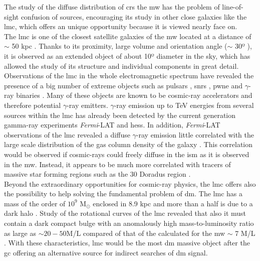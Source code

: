 \documentclass[main.tex]{subfiles}
\begin{document}
The study of the diffuse distribution of \glspl{cr} the \gls{mw} has the problem of line-of-sight confusion of sources, encouraging its study in other close galaxies like the \gls{lmc}, which offers an unique opportunity because it is viewed nearly face on.\\

The \gls{lmc} is one of the closest satellite galaxies of the \gls{mw} located at a distance of $\sim$ 50 kpc \cite{2013LMCdistance1}. Thanks to its proximity, large volume and orientation angle ($\sim$ 30º \cite{2004StructureandOrientationLMC}), it is observed as an extended object of about 10º diameter in the sky, which has allowed the study of its structure and individual components in great detail. Observations of the \gls{lmc} in the whole electromagnetic spectrum have revealed the presence of a big number of extreme objects such as pulsars \cite{2013RadioPulsarsLMC} \cite{2016LMCFermiLAT}, \glspl{snr} \cite{2015MultiwavelengthLMCsnr} \cite{2012XMM1987} \cite{2016SNRinXrayLMC},  \gls{pwne} \cite{2015HESSTeVLMC} \cite{2016LMCFermiLAT} \cite{2003PWNeintheLMC} \cite{2008PWNeXrayLMC} and $\gamma$-ray binaries \cite{2017HESSLMCP3}. Many of these objects are known to be cosmic-ray accelerators and therefore potential $\gamma$-ray emitters. $\gamma$-ray emission up to TeV energies from several sources within the \gls{lmc} has already been detected by the current generation gamma-ray experiments \textit{Fermi}-LAT and \gls{hess}. In addition, \textit{Fermi}-LAT observations of the \gls{lmc} revealed a diffuse $\gamma$-ray emission little correlated with the large scale distribution of the gas column density of the galaxy \cite{2010FermiLATLMC11months}. This correlation would be observed if cosmic-rays could freely diffuse in the \gls{ism} as it is observed in the \gls{mw}. Instead, it appears to be much more correlated with tracers of massive star forming regions such as the 30 Doradus region \cite{2012CRinLMC30Doradus}.\\
Beyond the extraordinary opportunities for cosmic-ray physics, the \gls{lmc} offers also the possibility to help solving the fundamental problem of \gls{dm}. The \gls{lmc} has a mass of the order of $10^9$ M$_{\odot}$ enclosed in 8.9 kpc and more than a half is due to a dark halo \cite{2002LMCkinematics}. Study of the rotational curves of the \gls{lmc} revealed that also it must contain a dark compact bulge with an anomalously high mass-to-luminosity ratio as large as $\sim 20-50$M/L \cite{1999LMCbulge} compared of that of the calculated for the \gls{mw} $\sim$ 7 M/L \cite{2013MWbulge}. With these characteristics, \gls{lmc} would be the most \gls{dm} massive object after the \gls{gc} offering an alternative source for indirect searches of \gls{dm} signal.\\
\end{document}
